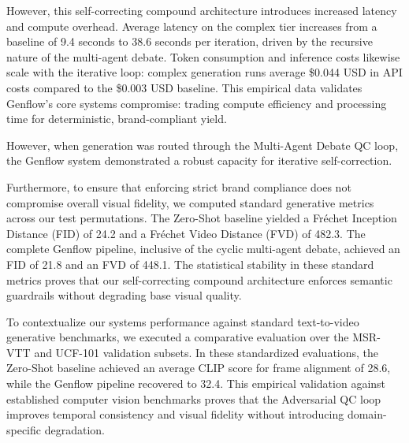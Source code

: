\documentclass[sigconf]{acmart}
\begin{document}
However, this self-correcting compound architecture introduces increased latency and compute overhead. Average latency on the complex tier increases from a baseline of 9.4 seconds to 38.6 seconds per iteration, driven by the recursive nature of the multi-agent debate. Token consumption and inference costs likewise scale with the iterative loop: complex generation runs average \$0.044 USD in API costs compared to the \$0.003 USD baseline. This empirical data validates Genflow's core systems compromise: trading compute efficiency and processing time for deterministic, brand-compliant yield.

However, when generation was routed through the Multi-Agent Debate QC loop, the Genflow system demonstrated a robust capacity for iterative self-correction.

\begin{table}[htbp]
\centering
\caption{Quantitative Split of Failure Modes and QC Recovery Efficacy.}
\label{tab:failure_modes}
\end{table}

Furthermore, to ensure that enforcing strict brand compliance does not compromise overall visual fidelity, we computed standard generative metrics across our test permutations. The Zero-Shot baseline yielded a Fréchet Inception Distance (FID) of 24.2 and a Fréchet Video Distance (FVD) of 482.3. The complete Genflow pipeline, inclusive of the cyclic multi-agent debate, achieved an FID of 21.8 and an FVD of 448.1. The statistical stability in these standard metrics proves that our self-correcting compound architecture enforces semantic guardrails without degrading base visual quality.

To contextualize our systems performance against standard text-to-video generative benchmarks, we executed a comparative evaluation over the MSR-VTT and UCF-101 validation subsets. In these standardized evaluations, the Zero-Shot baseline achieved an average CLIP score for frame alignment of 28.6, while the Genflow pipeline recovered to 32.4. This empirical validation against established computer vision benchmarks proves that the Adversarial QC loop improves temporal consistency and visual fidelity without introducing domain-specific degradation.
\end{document}
